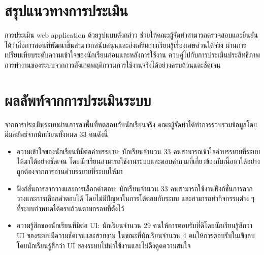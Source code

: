 \section{สรุปแนวทางการประเมิน}
การประเมิน web application ด้วยรูปแบบดังกล่าว ช่วยให้คณะผู้จัดทำสามารถตรวจสอบและยืนยันได้ว่าสื่อการสอนที่พัฒนาขึ้นสามารถสนับสนุนและส่งเสริมการเรียนรู้เรื่องเศษส่วนได้จริง 
ผ่านการเปรียบเทียบระดับความเข้าใจของนักเรียนก่อนและหลังการใช้งาน ควบคู่ไปกับการประเมินประสิทธิภาพการทำงานของระบบจากการสังเกตพฤติกรรมการใช้งานจริงได้อย่างครบถ้วนและชัดเจน

\section{ผลลัพท์จากการประเมินระบบ}
จากการประเมินระบบผ่านการลงพื้นที่ทดสอบกับนักเรียนจริง คณะผู้จัดทำได้ทำการรวบรวมข้อมูลโดยมีผลลัพธ์จากนักเรียนทั้งหมด 33 คนดังนี้
\begin{itemize}
    \item ความเข้าใจของนักเรียนที่มีต่อคำบรรยาย: นักเรียนจำนวน 33 คนสามารถเข้าใจคำบรรยายที่ระบบให้มาได้อย่างชัดเจน โดยนักเรียนสามารถใช้งานระบบและตอบคำถามที่เกี่ยวข้องกับเนื้อหาได้อย่างถูกต้องจากการอ่านคำบรรยายที่ระบบให้มา
    \item ฟังก์ชั่นการลากวางและการเลือกคำตอบ: นักเรียนจำนวน 33 คนสามารถใช้งานฟังก์ชั่นการลากวางและการเลือกคำตอบได้ โดยไม่มีปัญหาในการโต้ตอบกับระบบ และสามารถทำกิจกรรมต่าง ๆ ที่ระบบกำหนดได้ครบถ้วนตามกรอบที่ตั้งไว้
    \item ความรู้สึกของนักเรียนที่มีต่อ UI: นักเรียนจำนวน 29 คนให้การตอบรับที่ดีโดยนักเรียนรู้สึกว่า UI ของระบบมีความชัดเจนและสวยงาม ในขณะที่นักเรียนจำนวน 4 คนให้การตอบรับในเชิงลบ โดยนักเรียนรู้สึกว่า UI ของระบบไม่น่าใช้งานและไม่ดึงดูดความสนใจ
\end{itemize}

